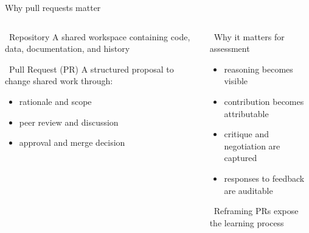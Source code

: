 \documentclass[
    NAME={Dr. Helga Ingimundardóttir},
    EMAIL={helgaingim@hi.is},
    FACULTY={Industrial Engineering},
    TITLE={Using Pull Requests to Make Collaboration Visible in CDIO Project-Based Courses},
    SEMINAR={22\textsuperscript{nd} International CDIO Conference},
    DATE={June 22\textsuperscript{nd} 2026},
    WIDE=true
]{HI-LaTeX/hi-beamer}
\begin{document}
\begin{frame}{Why pull requests matter}
\begin{columns}[T,onlytextwidth]
\begin{column}{.44\textwidth}
\begin{block}{\faDatabase~Repository}
A shared workspace containing code, data, documentation, and history
\end{block}
\begin{block}{\faCodePullRequest~Pull Request (PR)}
A structured proposal to change shared work through:
\begin{itemize}
    \item rationale and scope
    \item peer review and discussion
    \item approval and merge decision
\end{itemize}
\end{block}
\end{column}
\begin{column}{.51\textwidth}
\begin{exampleblock}{\faMagnifyingGlass~Why it matters for assessment}
\begin{itemize}
    \item reasoning becomes visible
    \item contribution becomes attributable
    \item critique and negotiation are captured
    \item responses to feedback are auditable
\end{itemize}
\end{exampleblock}
\vspace{0.4em}
\begin{alertblock}{\faLightbulb~Reframing}
PRs expose the learning process
\end{alertblock}
\end{column}
\end{columns}
\end{frame}
\end{document}
